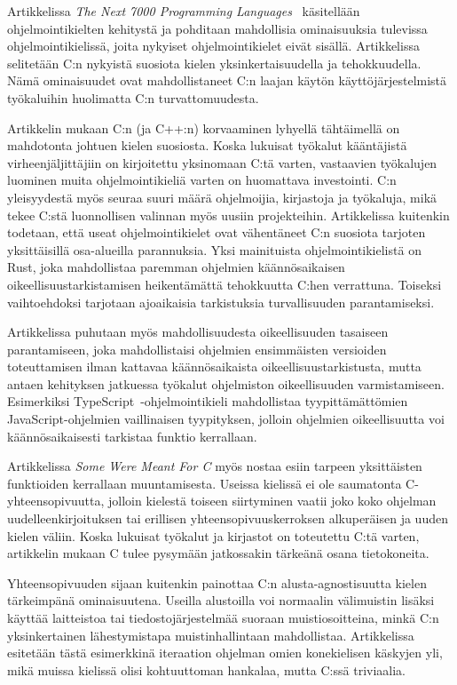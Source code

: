 Artikkelissa \emph{The Next 7000 Programming Languages}~\citep{next7000}
käsitellään ohjelmointikielten kehitystä ja pohditaan mahdollisia ominaisuuksia
tulevissa ohjelmointikielissä, joita nykyiset ohjelmointikielet eivät sisällä.
Artikkelissa selitetään C:n nykyistä suosiota kielen yksinkertaisuudella ja
tehokkuudella. Nämä ominaisuudet ovat mahdollistaneet C:n laajan käytön
käyttöjärjestelmistä työkaluihin huolimatta C:n turvattomuudesta.

Artikkelin mukaan C:n (ja C++:n) korvaaminen lyhyellä tähtäimellä on mahdotonta
johtuen kielen suosiosta. Koska lukuisat työkalut kääntäjistä
virheenjäljittäjiin on kirjoitettu yksinomaan C:tä varten,
vastaavien työkalujen luominen muita ohjelmointikieliä varten on huomattava
investointi. C:n yleisyydestä myös seuraa suuri määrä ohjelmoijia, kirjastoja
ja työkaluja, mikä tekee C:stä luonnollisen valinnan myös uusiin projekteihin.
Artikkelissa kuitenkin todetaan, että useat ohjelmointikielet ovat vähentäneet
C:n suosiota tarjoten yksittäisillä osa-alueilla parannuksia. Yksi mainituista
ohjelmointikielistä on Rust, joka mahdollistaa paremman ohjelmien
käännösaikaisen oikeellisuustarkistamisen heikentämättä tehokkuutta C:hen
verrattuna. Toiseksi vaihtoehdoksi tarjotaan ajoaikaisia tarkistuksia
turvallisuuden parantamiseksi.

Artikkelissa puhutaan myös mahdollisuudesta oikeellisuuden tasaiseen
parantamiseen, joka mahdollistaisi ohjelmien
ensimmäisten versioiden toteuttamisen ilman kattavaa käännösaikaista
oikeellisuustarkistusta, mutta antaen kehityksen jatkuessa työkalut ohjelmiston
oikeellisuuden varmistamiseen. Esimerkiksi
TypeScript~\citep{typescript}-ohjelmointikieli mahdollistaa tyypittämättömien
JavaScript-ohjelmien vaillinaisen tyypityksen, jolloin
ohjelmien oikeellisuutta voi käännösaikaisesti tarkistaa funktio kerrallaan. 

Artikkelissa \emph{Some Were Meant For C} \citet{somemeantforc} myös nostaa
esiin tarpeen yksittäisten funktioiden kerrallaan muuntamisesta. Useissa
kielissä ei ole saumatonta C-yhteensopivuutta, jolloin kielestä toiseen
siirtyminen vaatii joko koko ohjelman uudelleenkirjoituksen tai erillisen
yhteensopivuuskerroksen alkuperäisen ja uuden kielen väliin. Koska lukuisat
työkalut ja kirjastot on toteutettu C:tä varten, artikkelin mukaan C tulee
pysymään jatkossakin tärkeänä osana tietokoneita.

Yhteensopivuuden sijaan \citeauthor{somemeantforc} kuitenkin painottaa C:n
alusta-agnostisuutta kielen tärkeimpänä ominaisuutena. Useilla alustoilla
voi normaalin välimuistin lisäksi käyttää laitteistoa tai tiedostojärjestelmää
suoraan muistiosoitteina, minkä C:n yksinkertainen lähestymistapa
muistinhallintaan mahdollistaa. Artikkelissa esitetään tästä esimerkkinä
iteraation ohjelman omien konekielisen käskyjen yli, mikä muissa kielissä olisi
kohtuuttoman hankalaa, mutta C:ssä triviaalia.

